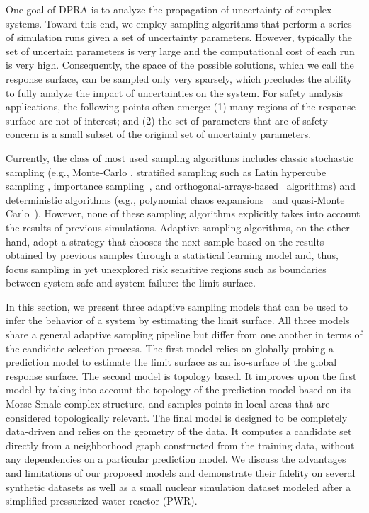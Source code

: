 One goal of DPRA is to analyze the propagation of uncertainty of complex systems.
%
Toward this end, we employ sampling algorithms that perform a series of simulation runs given a set of uncertainty parameters.
%
However, typically the set of uncertain parameters is very large and the computational cost of each run is very high.
%
Consequently, the space of the possible solutions, which we call the response surface, can be sampled only very sparsely, which precludes the ability to fully analyze the impact of uncertainties on the system.
%
For safety analysis applications, the following points often emerge: (1) many regions of the response surface are not of interest; and (2) the set of parameters that are of safety concern is a small subset of the original set of uncertainty parameters.

Currently, the class of most used sampling algorithms includes classic stochastic sampling (e.g., Monte-Carlo \cite{Hastings1970,Liu2001}, stratified sampling such as Latin hypercube sampling \cite{HeltonDavis2003}, importance sampling~\cite{Geweke1989}, and orthogonal-arrays-based~\cite{Owen1992} algorithms) and deterministic algorithms (e.g., polynomial chaos expansions~\cite{Najm2009} and quasi-Monte Carlo~\cite{Caflisch1998}).
%
However, none of these sampling algorithms explicitly takes into account the results of previous simulations.
%
Adaptive sampling algorithms, on the other hand, adopt a strategy that chooses the next sample based on the results obtained by previous samples through a statistical learning model and, thus, focus sampling in yet unexplored risk sensitive regions such as boundaries between system safe and system failure: the limit surface.

In this section, we present three adaptive sampling models that can be used to infer the behavior of a system by estimating the limit surface.
%
All three models share a general adaptive sampling pipeline but differ from one another in terms of the candidate selection process.
%
The first model relies on globally probing a prediction model to estimate the limit surface as an iso-surface of the global response surface.
%
The second model is topology based.
%
It improves upon the first model by taking into account the topology of the prediction model based on its Morse-Smale complex structure, and samples points in local areas that are considered topologically relevant.
%
The final model is designed to be completely data-driven and relies on the geometry of the data. It computes a candidate set directly from a neighborhood graph constructed from the training data, without any dependencies on a particular prediction model.
%
We discuss the advantages and limitations of our proposed models and demonstrate their fidelity on several synthetic datasets as well as a small nuclear simulation dataset modeled after a simplified pressurized water reactor (PWR).

